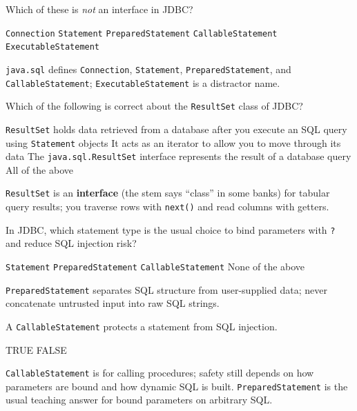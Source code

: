 \question[4]
Which of these is \emph{not} an interface in JDBC?
\begin{choices}
  \choice \texttt{Connection}
  \choice \texttt{Statement}
  \choice \texttt{PreparedStatement}
  \choice \texttt{CallableStatement}
  \CorrectChoice \texttt{ExecutableStatement}
\end{choices}
\begin{solution}
  \texttt{java.sql} defines \texttt{Connection}, \texttt{Statement}, \texttt{PreparedStatement}, and \texttt{CallableStatement}; \texttt{ExecutableStatement} is a distractor name.
\end{solution}

\question[4]
Which of the following is correct about the \texttt{ResultSet} class of JDBC?
\begin{choices}
  \choice \texttt{ResultSet} holds data retrieved from a database after you execute an SQL query using \texttt{Statement} objects
  \choice It acts as an iterator to allow you to move through its data
  \choice The \texttt{java.sql.ResultSet} interface represents the result of a database query
  \CorrectChoice All of the above
\end{choices}
\begin{solution}
  \texttt{ResultSet} is an \textbf{interface} (the stem says ``class'' in some banks) for tabular query results; you traverse rows with \texttt{next()} and read columns with getters.
\end{solution}

\question[4]
In JDBC, which statement type is the usual choice to bind parameters with \texttt{?} and reduce SQL injection risk?
\begin{choices}
  \choice \texttt{Statement}
  \CorrectChoice \texttt{PreparedStatement}
  \choice \texttt{CallableStatement}
  \choice None of the above
\end{choices}
\begin{solution}
  \texttt{PreparedStatement} separates SQL structure from user-supplied data; never concatenate untrusted input into raw SQL strings.
\end{solution}

\question[4]
A \texttt{CallableStatement} protects a statement from SQL injection.
\begin{choices}
  \choice TRUE
  \CorrectChoice FALSE
\end{choices}
\begin{solution}
  \texttt{CallableStatement} is for calling procedures; safety still depends on how parameters are bound and how dynamic SQL is built. \texttt{PreparedStatement} is the usual teaching answer for bound parameters on arbitrary SQL.
\end{solution}

